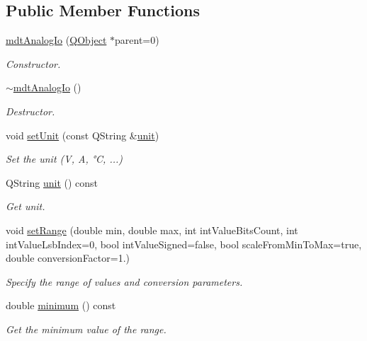 \subsection*{Public Member Functions}
\begin{DoxyCompactItemize}
\item 
\hyperlink{classmdt_analog_io_affcdf039a10023b495cf49a5f476f829}{mdt\-Analog\-Io} (\hyperlink{class_q_object}{Q\-Object} $\ast$parent=0)
\begin{DoxyCompactList}\small\item\em Constructor. \end{DoxyCompactList}\item 
\hyperlink{classmdt_analog_io_a7ec3c075b1d49c2d0917c09e4950b856}{$\sim$mdt\-Analog\-Io} ()
\begin{DoxyCompactList}\small\item\em Destructor. \end{DoxyCompactList}\item 
void \hyperlink{classmdt_analog_io_afb4cd82bee1ac1e77148c8621b1c66fa}{set\-Unit} (const Q\-String \&\hyperlink{classmdt_analog_io_a126d5b9bf4a0bb9ce9f2ff6a010fef0e}{unit})
\begin{DoxyCompactList}\small\item\em Set the unit (V, A, °\-C, ...) \end{DoxyCompactList}\item 
Q\-String \hyperlink{classmdt_analog_io_a126d5b9bf4a0bb9ce9f2ff6a010fef0e}{unit} () const 
\begin{DoxyCompactList}\small\item\em Get unit. \end{DoxyCompactList}\item 
void \hyperlink{classmdt_analog_io_a7ce54314b02625aa45aa3e48c4855948}{set\-Range} (double min, double max, int int\-Value\-Bits\-Count, int int\-Value\-Lsb\-Index=0, bool int\-Value\-Signed=false, bool scale\-From\-Min\-To\-Max=true, double conversion\-Factor=1.)
\begin{DoxyCompactList}\small\item\em Specify the range of values and conversion parameters. \end{DoxyCompactList}\item 
double \hyperlink{classmdt_analog_io_acd2b8cb33d5d42abf23672ad7675825e}{minimum} () const 
\begin{DoxyCompactList}\small\item\em Get the minimum value of the range. \end{DoxyCompactList}\item 

\end{DoxyCompactItemize}
